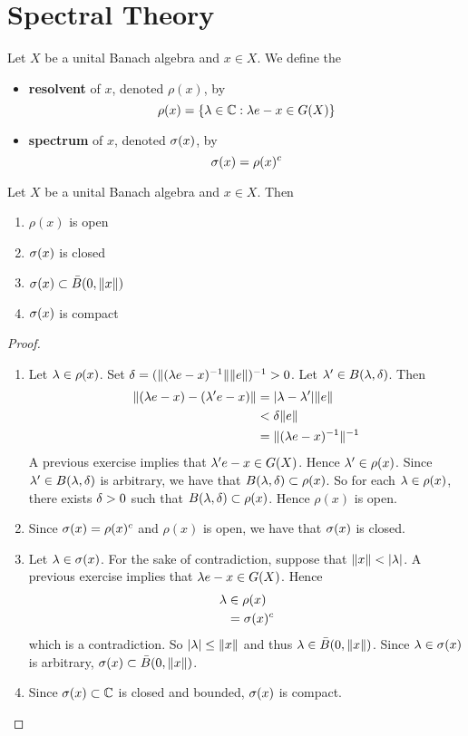 \documentclass{book}
\begin{document}
\newpage
\section{Spectral Theory}

\begin{defn}
	Let $X$ be a unital Banach algebra and $x \in X$. We define the
	\begin{itemize}
		\item \textbf{resolvent} of $x$, denoted $\rho(x)$, by 
		$$\rho(x) = \{\lambda \in \mathbb{C}: \lambda e - x \in G(X)\}$$
		\item \textbf{spectrum} of $x$, denoted $\sigma(x)$, by 
		$$\sigma(x) = \rho(x)^c$$ 
	\end{itemize}
\end{defn}

\begin{ex}
	Let $X$ be a unital Banach algebra and $x \in X$. Then 
	\begin{enumerate}
		\item $\rho(x)$ is open
		\item $\sigma(x)$ is closed
		\item $\sigma(x) \subset \bar{B}(0, \|x\|)$
		\item  $\sigma(x)$ is compact
	\end{enumerate} 
\end{ex}

\begin{proof}\
	\begin{enumerate}
		\item Let $\lambda \in \rho(x)$. Set $\delta = (\|(\lambda e - x)^{-1}\| \|e\| )^{-1} > 0$. Let $\lambda' \in B(\lambda, \delta)$. Then 
		\begin{align*}
			\|(\lambda e - x) - (\lambda' e - x)\| 
			& = |\lambda - \lambda '|\|e\| \\
			& <  \delta \|e\| \\
			& = \|(\lambda e - x)^{-1}\|^{-1} \\
		\end{align*}
		A previous exercise implies that $\lambda' e - x \in G(X)$. Hence $\lambda' \in \rho(x)$. Since $\lambda' \in B(\lambda, \delta)$ is arbitrary, we have that $B(\lambda, \delta) \subset \rho(x)$. So for each $\lambda \in \rho(x)$, there exists $\delta >0$ such that $B(\lambda ,\delta) \subset \rho(x)$. Hence $\rho(x)$ is open.
		\item Since $\sigma(x) = \rho(x)^c$ and $\rho(x)$ is open, we have that $\sigma(x)$ is closed.
		\item Let $\lambda \in \sigma(x)$. For the sake of contradiction, suppose that $\|x\| < |\lambda|$. A previous exercise implies that $\lambda e - x \in G(X)$. Hence 
		\begin{align*}
			\lambda 
			& \in \rho(x) \\
			& = \sigma(x)^c
		\end{align*}
		which is a contradiction. So $|\lambda| \leq \|x\|$ and thus $\lambda \in \bar{B}(0, \|x\|)$. Since $\lambda \in \sigma(x)$ is arbitrary, $\sigma(x) \subset \bar{B}(0, \|x\|)$.
		\item Since $\sigma(x) \subset \mathbb{C}$ is closed and bounded, $\sigma(x)$ is compact.
	\end{enumerate} 
\end{proof}
\end{document}
